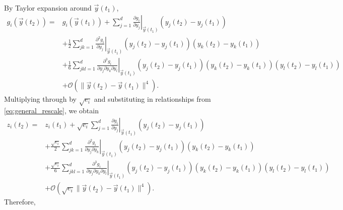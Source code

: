 \documentclass[12pt]{article}
\begin{document}
By Taylor expansion around $\vec{y}(t_1)$,
%
\begin{equation}
\begin{aligned}
g_i(\vec{y}(t_2)) =& 
g_i(\vec{y}(t_1)) + \sum_{j=1}^d \left. \frac{\partial g_i}{\partial y_j} \right|_{\vec{y}(t_1)} (y_j(t_2)-y_j(t_1))\\
&+ \frac{1}{2} \sum_{jk=1}^d \left. \frac{\partial^2 g_i}{\partial y_j} \right|_{\vec{y}(t_1)} (y_j(t_2)-y_j(t_1)) (y_k(t_2)-y_k(t_1))\\
&+ \frac{1}{6} \sum_{jkl=1}^d \left. \frac{\partial^3 g_i}{\partial y_j \partial y_k \partial y_l} \right|_{\vec{y}(t_1)} (y_j(t_2)-y_j(t_1)) (y_k(t_2)-y_k(t_1)) (y_l(t_2)-y_l(t_1)) \\
&+ \mathcal{O}( \|\vec{y}(t_2) - \vec{y}(t_1) \|^4) .
\end{aligned}
\end{equation}
%
Multiplying through by $\sqrt{e_i}$ and
substituting in relationships from \eqref{eq:general_rescale}, we obtain
%
\begin{equation}
\begin{aligned}
z_i(t_2) =& 
z_i(t_1) + \sqrt{e_i} \sum_{j=1}^d \left. \frac{\partial g_i}{\partial y_j} \right|_{\vec{y}(t_1)} (y_j(t_2)-y_j(t_1))\\
&+ \frac{\sqrt{e_i}}{2} \sum_{jk=1}^d \left. \frac{\partial^2 g_i}{\partial y_j \partial y_k} \right|_{\vec{y}(t_1)} (y_j(t_2)-y_j(t_1)) (y_k(t_2)-y_k(t_1))\\
&+ \frac{\sqrt{e_i}}{6} \sum_{jkl=1}^d \left. \frac{\partial^3 g_i}{\partial y_j \partial y_k \partial y_l} \right|_{\vec{y}(t_1)} (y_j(t_2)-y_j(t_1)) (y_k(t_2)-y_k(t_1)) (y_l(t_2)-y_l(t_1)) \\
&+ \mathcal{O}( \sqrt{e_i} \|\vec{y}(t_2) - \vec{y}(t_1) \|^4) .
\end{aligned}
\end{equation}
%
Therefore, 
%
\end{document}
